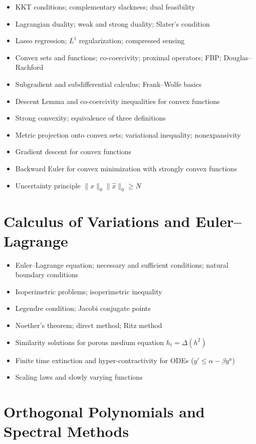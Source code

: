 \documentclass{amsart}
\begin{document}
\begin{itemize}
  \item KKT conditions; complementary slackness; dual feasibility
  \item Lagrangian duality; weak and strong duality; Slater's condition
  \item Lasso regression; $L^1$ regularization; compressed sensing
  \item Convex sets and functions; co-coercivity; proximal operators; FBP; Douglas--Rachford
  \item Subgradient and subdifferential calculus; Frank--Wolfe basics
  \item Descent Lemma and co-coercivity inequalities for convex functions
  \item Strong convexity; equivalence of three definitions
  \item Metric projection onto convex sets; variational inequality; nonexpansivity
  \item Gradient descent for convex functions
  \item Backward Euler for convex minimization with strongly convex functions
  \item Uncertainty principle $\|x\|_0 \|\hat{x}\|_0 \geq N$
\end{itemize}

\section{Calculus of Variations and Euler--Lagrange}

\begin{itemize}
  \item Euler--Lagrange equation; necessary and sufficient conditions; natural boundary conditions
  \item Isoperimetric problems; isoperimetric inequality
  \item Legendre condition; Jacobi conjugate points
  \item Noether's theorem; direct method; Ritz method
  \item Similarity solutions for porous medium equation $h_t = \Delta(h^2)$
  \item Finite time extinction and hyper-contractivity for ODEs ($y' \leq \alpha - \beta y^a$)
  \item Scaling laws and slowly varying functions
\end{itemize}

\section{Orthogonal Polynomials and Spectral Methods}
\end{document}
